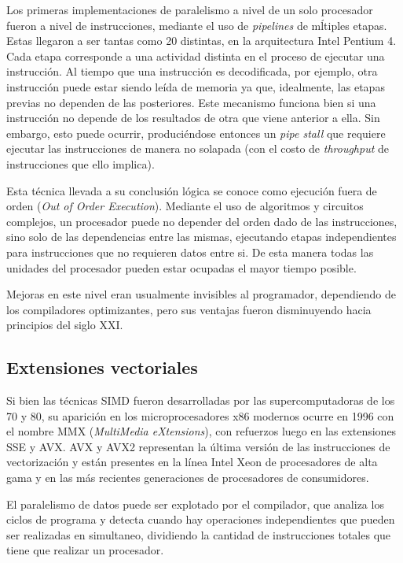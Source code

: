 Los primeras implementaciones de paralelismo a nivel de un solo procesador fueron a nivel de instrucciones, mediante el uso
de \textit{pipelines} de m\'ltiples etapas. Estas llegaron a ser tantas como 20 distintas, en la arquitectura
Intel Pentium 4. Cada etapa corresponde a una actividad distinta en el proceso de ejecutar una instrucci\'on.
Al tiempo que una instrucci\'on es decodificada, por ejemplo, otra instrucci\'on puede estar siendo le\'ida
de memoria ya que, idealmente, las etapas previas no dependen de las posteriores. Este mecanismo funciona bien
si una instrucci\'on no depende de los resultados de otra que viene anterior a ella. Sin embargo, esto puede
ocurrir, produci\'endose entonces un \textit{pipe stall} que requiere ejecutar las instrucciones de manera no solapada
(con el costo de \textit{throughput} de instrucciones que ello implica).

Esta t\'ecnica llevada a su conclusi\'on l\'ogica se conoce como ejecuci\'on fuera de orden (\textit{Out of Order
Execution}). Mediante el uso de algoritmos y circuitos complejos, un procesador puede no depender del orden dado
de las instrucciones, sino solo de las dependencias entre las mismas, ejecutando etapas independientes para
instrucciones que no requieren datos entre si. De esta manera todas las unidades del procesador pueden estar
ocupadas el mayor tiempo posible.

Mejoras en este nivel eran usualmente invisibles al programador, dependiendo de los compiladores optimizantes,
pero sus ventajas fueron disminuyendo hacia principios del siglo XXI.

\subsection{Extensiones vectoriales}

Si bien las t\'ecnicas SIMD fueron desarrolladas por las supercomputadoras de los 70 y 80, su aparici\'on en los
microprocesadores x86 modernos ocurre en 1996 con el nombre MMX (\textit{MultiMedia eXtensions}), con refuerzos luego en las
extensiones SSE y AVX. AVX y AVX2 representan la \'ultima versi\'on de las instrucciones de vectorizaci\'on y est\'an presentes
en la l\'inea Intel Xeon de procesadores de alta gama y en las m\'as recientes generaciones de procesadores de consumidores.

El paralelismo de datos puede ser explotado por el compilador, que analiza los ciclos de programa y detecta cuando hay operaciones
independientes que pueden ser realizadas en simultaneo, dividiendo la cantidad de instrucciones totales que tiene que realizar
un procesador.

